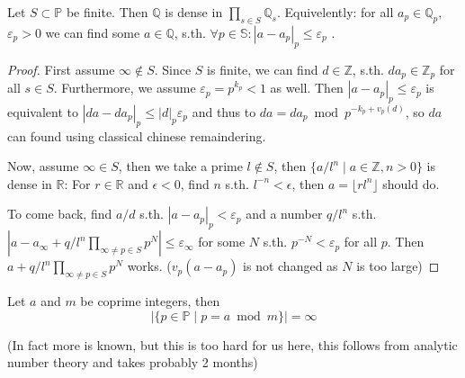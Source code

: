 \begin{lemma}
  Let $S\subset \mathbb P$ be finite. Then $\mathbb Q$ is dense in $\prod_{s\in S} \mathbb Q_s$.
  Equivelently: for all $a_p\in \mathbb Q_p$, $\varepsilon_p>0$ we can find some 
  $a\in\mathbb Q$, s.th. $\forall p\in \mathbb S: |a-a_p|_p \le \varepsilon_p$ .
\end{lemma}
\begin{proof}
  First assume $\infty \not\in S$. Since $S$ is finite, we can find
  $d\in \mathbb Z$, s.th. $da_p\in \mathbb Z_p$ for all $s\in S$.
  Furthermore, we assume $\varepsilon_p =p^{k_p} < 1$ as well. Then
  $|a-a_p|_p \le \varepsilon_p$ is equivalent to 
  $|da-da_p|_p \le |d|_p\varepsilon_p$ and thus to
  $da=da_p \bmod p^{-k_p+v_p(d)}$, so $da$ can found using
  classical chinese remaindering.

  Now, assume $\infty\in S$, then we take a prime $l\not\in S$, then
  $\{a/l^n \mid a\in \mathbb Z, n>0\}$ is dense in $\mathbb R$:
  For $r\in \mathbb R$ and $\epsilon <0$, find $n$ s.th. $l^{-n} < \epsilon$, 
  then $a = \lfloor rl^n\rfloor$ should do.

  To come back, find $a/d$ s.th. $|a -a_p|_p < \varepsilon_p$ and
  a number $q/l^n$ s.th. $|a - a_\infty +q/l^n\prod_{\infty \ne p \in S}  p^N | \le \varepsilon_\infty$
  for some $N$ s.th. $p^{-N} < \varepsilon_p$ for all $p$.
  Then $a+q/l^n\prod_{\infty \ne p \in S}  p^N$ works.
  ($v_p(a-a_p)$ is not changed as $N$ is too large)
\end{proof}

\begin{lemma}
  Let $a$ and $m$ be coprime integers, then
  $$|\{p\in \mathbb P \mid p=a\bmod m\}| = \infty$$
\end{lemma}
(In fact more is known, but this is too hard for us here, this follows
from analytic number theory and takes probably 2 months)


